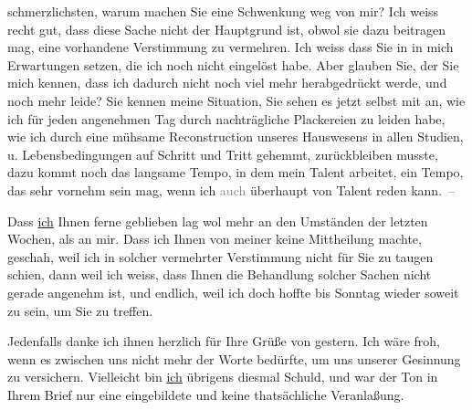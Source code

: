                schmerzlichsten, warum machen Sie eine Schwenkung weg von mir? Ich
               weiss recht gut, dass diese Sache nicht der Hauptgrund ist, obwol sie dazu beitragen
               mag, eine vorhandene Verstimmung zu vermehren. Ich weiss dass Sie in \label{K_L03132-3v}\label{K_L03132-3} in mich Erwartungen setzen, die ich noch nicht eingelöst habe. Aber glauben
               Sie, der Sie mich kennen, dass ich dadurch nicht noch viel mehr herabgedrückt werde,
               und noch mehr leide? Sie kennen meine Situation, Sie sehen es jetzt selbst mit an,
               wie ich für jeden ange{\pb}nehmen Tag durch nachträgliche Plackereien zu leiden habe, wie ich durch eine
               mühsame Reconstruction unseres Hauswesens in allen Studien, u. Lebensbedingungen auf
               Schritt und Tritt gehemmt, zurückbleiben musste, dazu kommt noch das langsame Tempo,
               in dem mein Talent arbeitet, ein Tempo, das sehr
               vornehm sein mag, wenn ich \introOben{}\textcolor{gray}{auch}\introOben{} überhaupt von Talent reden kann. –\pend
           
\pstart
           Dass \uline{ich} Ihnen ferne geblieben
               lag wol mehr an den Umständen der letzten Wochen, als an mir. Dass ich Ihnen von
               meiner \label{K_L03132-4v}\label{K_L03132-4} keine Mittheilung
               machte, geschah, weil ich in solcher vermehrter {\pb}Verstimmung nicht für Sie zu
               taugen schien, dann weil ich weiss, dass Ihnen die Behandlung solcher Sachen nicht
               gerade angenehm ist, und endlich, weil ich doch hoffte bis Sonntag wieder soweit zu sein, um Sie zu treffen.\pend
           
\pstart
           Jedenfalls danke ich ihnen herzlich für Ihre Grüße von gestern. Ich wäre froh, wenn es zwischen uns nicht mehr der Worte
               bedürfte, um uns unserer Gesinnung zu versichern.
               Vielleicht bin \uline{ich} übrigens diesmal Schuld, und war
               der Ton in Ihrem Brief nur eine eingebildete
               und keine thatsächliche Veranlaßung.\pend
           
